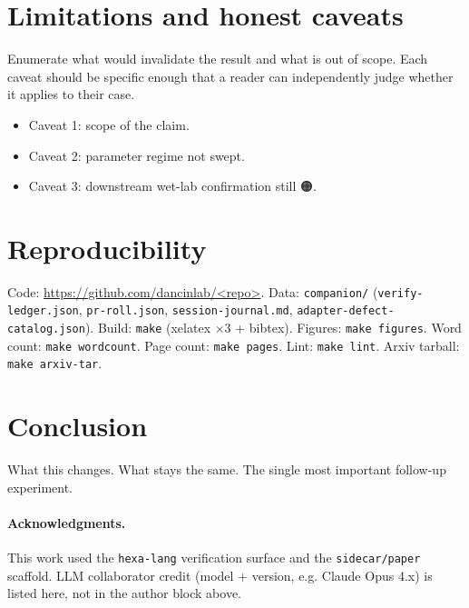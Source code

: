 \documentclass[11pt,a4paper]{article}
\providecommand{\tierOrange}{🟠}
\begin{document}
\section{Limitations and honest caveats}
\label{sec:limits}

Enumerate what would invalidate the result and what is out of scope.
Each caveat should be specific enough that a reader can independently
judge whether it applies to their case.

\begin{itemize}\itemsep0.2em
\item Caveat 1: scope of the claim.
\item Caveat 2: parameter regime not swept.
\item Caveat 3: downstream wet-lab confirmation still \tierOrange.
\end{itemize}

\section{Reproducibility}
\label{sec:repro}

Code: \url{https://github.com/dancinlab/<repo>}. Data: \texttt{companion/}
(\texttt{verify-ledger.json}, \texttt{pr-roll.json},
\texttt{session-journal.md}, \texttt{adapter-defect-catalog.json}).
Build: \texttt{make} (xelatex \(\times 3\) + bibtex). Figures: \texttt{make figures}.
Word count: \texttt{make wordcount}. Page count: \texttt{make pages}.
Lint: \texttt{make lint}. Arxiv tarball: \texttt{make arxiv-tar}.

\section{Conclusion}
\label{sec:conclusion}

What this changes. What stays the same. The single most important
follow-up experiment.

\paragraph{Acknowledgments.}
This work used the \texttt{hexa-lang} verification surface and the
\texttt{sidecar/paper} scaffold. LLM collaborator credit (model + version,
e.g. Claude Opus 4.x) is listed here, not in the author block above.



\end{document}
